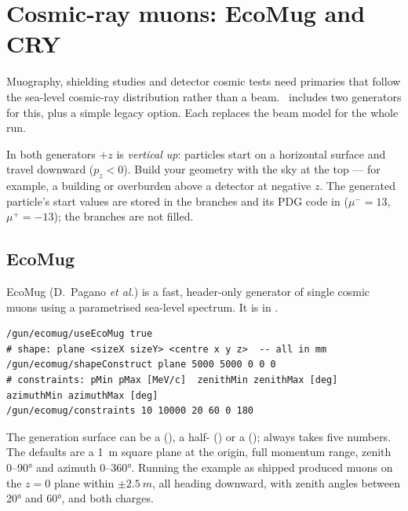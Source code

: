 \chapter{Cosmic-ray muons: EcoMug and CRY}
\label{app:cosmics}
Muography, shielding studies and detector cosmic tests need primaries that follow the sea-level cosmic-ray distribution rather than a beam. \musrSim\ includes two generators for this, plus a simple legacy option. Each replaces the  beam model for the whole run.

\begin{keypoint}
In both generators \(+z\) is \emph{vertical up}: particles start on a horizontal surface and travel downward (\(p_z<0\)). Build your geometry with the sky at the top --- for example, a building or overburden above a detector at negative \(z\). The generated particle's start values are stored in the  branches and its PDG code in  (\(\mu^-=13\), \(\mu^+=-13\)); the  branches are not filled.
\end{keypoint}

\section{EcoMug}
EcoMug (D.~Pagano \emph{et al.}) is a fast, header-only generator of single cosmic muons using a parametrised sea-level spectrum. It is in .

\begin{lstlisting}[style=mac,caption={EcoMug on a \SI{5}{m}\,\(\times\)\,\SI{5}{m} plane (from \texttt{run/EcoMugExample.mac})}]
/gun/ecomug/useEcoMug true
# shape: plane <sizeX sizeY> <centre x y z>  -- all in mm
/gun/ecomug/shapeConstruct plane 5000 5000 0 0 0
# constraints: pMin pMax [MeV/c]  zenithMin zenithMax [deg]  azimuthMin azimuthMax [deg]
/gun/ecomug/constraints 10 10000 20 60 0 180
\end{lstlisting}

The generation surface can be a  (), a half- () or a  ();  always takes five numbers. The defaults are a \SI{1}{m} square plane at the origin, full momentum range, zenith 0--\ang{90} and azimuth 0--\ang{360}. Running the example as shipped produced muons on the \(z=0\) plane within \(\pm\SI{2.5}{m}\), all heading downward, with zenith angles between \ang{20} and \ang{60}, and both charges.

